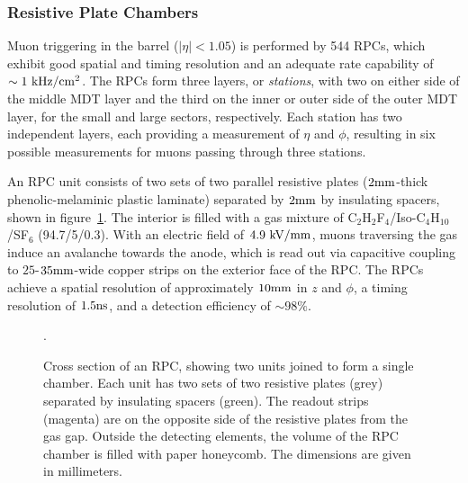 \subsubsection{Resistive Plate Chambers}
Muon triggering in the barrel ($|\eta|<1.05$) is performed by 544 RPCs, which exhibit good spatial and timing resolution and an adequate rate capability of $\sim1~\mbox{kHz}/\mathrm{cm}^2$. The RPCs form three layers, or \emph{stations}, with two on either side of the middle MDT layer and the third on the inner or outer side of the outer MDT layer, for the small and large sectors, respectively. Each station has two independent layers, each providing a measurement of $\eta$ and $\phi$, resulting in six possible measurements for muons passing through three stations. 

An RPC unit consists of two sets of two parallel resistive plates ($2 \mathrm{mm}$-thick phenolic-melaminic plastic laminate) separated by $2 \mathrm{mm}$ by insulating spacers, shown in figure~\ref{fig:ATLAS-MS-RPC-schematic}. The interior is filled with a gas mixture of C$_2$H$_2$F$_4$/Iso-C$_4$H$_{10}$/SF$_6$ (94.7/5/0.3). With an electric field of $4.9~\mbox{kV}/\mathrm{mm}$, muons traversing the gas induce an avalanche towards the anode, which is read out via capacitive coupling to $25$-$35 \mathrm{mm}$-wide copper strips on the exterior face of the RPC. The RPCs achieve a spatial resolution of approximately $10 \mathrm{mm}$ in $z$ and $\phi$, a timing resolution of $1.5 \mathrm{ns}$, and a detection efficiency of $\sim 98\%$. 

\begin{figure}[htbp]
	\centering
	\caption{Cross section of an RPC, showing two units joined to form a single chamber. Each unit has two sets of two resistive plates (grey) separated by insulating spacers (green). The readout strips (magenta) are on the opposite side of the resistive plates from the gas gap. Outside the detecting elements, the volume of the RPC chamber is filled with paper honeycomb. The dimensions are given in millimeters.}
	\label{fig:ATLAS-MS-RPC-schematic}.
\end{figure}

